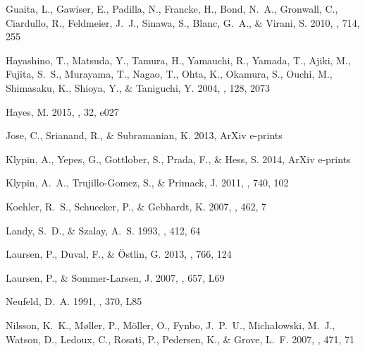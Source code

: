 \documentclass{emulateapj}
\begin{document}
\begin{thebibliography}{39}
  
{Guaita}, L., {Gawiser}, E., {Padilla}, N., {Francke}, H.,
	{Bond}, N.~A., {Gronwall}, C., {Ciardullo}, R., {Feldmeier}, J.~J., 
	{Sinawa}, S., {Blanc}, G.~A., \& {Virani}, S. 2010, \apj, 714, 255


{Hayashino}, T., {Matsuda}, Y., {Tamura}, H., {Yamauchi}, R., {Yamada}, T.,
  {Ajiki}, M., {Fujita}, S.~S., {Murayama}, T., {Nagao}, T., {Ohta}, K.,
  {Okamura}, S., {Ouchi}, M., {Shimasaku}, K., {Shioya}, Y., \& {Taniguchi}, Y.
  2004, \aj, 128, 2073

{Hayes}, M. 2015, \pasa, 32, e027

{Jose}, C., {Srianand}, R., \& {Subramanian}, K. 2013, ArXiv e-prints

{Klypin}, A., {Yepes}, G., {Gottlober}, S., {Prada}, F., \& {Hess}, S. 2014,
  ArXiv e-prints

{Klypin}, A.~A., {Trujillo-Gomez}, S., \& {Primack}, J. 2011, \apj, 740, 102

{Koehler}, R.~S., {Schuecker}, P., \& {Gebhardt}, K. 2007, \aap, 462, 7

{Landy}, S.~D., \& {Szalay}, A.~S. 1993, \apj, 412, 64

{Laursen}, P., {Duval}, F., \& {{\"O}stlin}, G. 2013, \apj, 766, 124

{Laursen}, P., \& {Sommer-Larsen}, J. 2007, \apjl, 657, L69

{Neufeld}, D.~A. 1991, \apjl, 370, L85

{Nilsson}, K.~K., {M{\o}ller}, P., {M{\"o}ller}, O., {Fynbo}, J.~P.~U.,
  {Micha{\l}owski}, M.~J., {Watson}, D., {Ledoux}, C., {Rosati}, P.,
  {Pedersen}, K., \& {Grove}, L.~F. 2007, \aap, 471, 71


\end{thebibliography}
\end{document}
